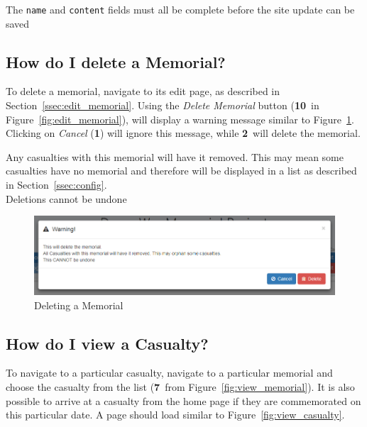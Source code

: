\documentclass[12pt]{article}
\newcommand{\marker}[1]{\color{red}\textbf{#1}\color{black}}
\begin{document}
\begin{infoBox}
The \texttt{name} and \texttt{content} fields must all be complete before the site update can be saved
\end{infoBox}

\FloatBarrier
\subsection{How do I delete a Memorial?}\label{ssec:delete_memorial}
To delete a memorial, navigate to its edit page, as described in Section~\ref{ssec:edit_memorial}. Using the \textit{Delete Memorial} button (\marker{10}\ in Figure~\ref{fig:edit_memorial}), will display a warning message similar to Figure~\ref{fig:delete_memorial}. Clicking on \textit{Cancel} (\marker{1}) will ignore this message, while \marker{2}\ will delete the memorial.

\begin{warningBox}
Any casualties with this memorial will have it removed. This may mean some casualties have no memorial and therefore will be displayed in a list as described in Section~\ref{ssec:config}.\\
Deletions cannot be undone
\end{warningBox}

\begin{figure}[h]
  \centering
 \includegraphics[width=.9\textwidth]{pics/delete_memorial.png}
	\caption{Deleting a Memorial}\label{fig:delete_memorial}
\end{figure}

\newpage
\FloatBarrier
\subsection{How do I view a Casualty?}\label{ssec:view_casualty}
To navigate to a particular casualty, navigate to a particular memorial and choose the casualty from the list (\marker{7}\ from Figure~\ref{fig:view_memorial}). It is also possible to arrive at a casualty from the home page if they are commemorated on this particular date. A page should load similar to Figure~\ref{fig:view_casualty}.
\end{document}
